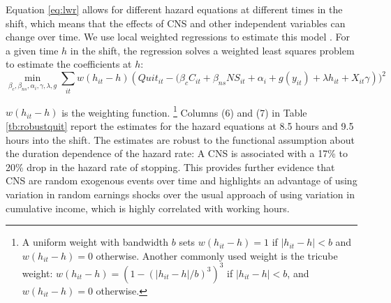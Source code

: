 \documentclass[reviewmode,AEJ]{AEA}
\begin{document}
Equation \eqref{eq:lwr} allows for different hazard equations at different times in the shift, which means that the effects of %
CNS and other independent variables can change over time. We use local weighted regressions to estimate this model \citep{cleveland1988locally}. For a given time $h$ in the shift, the regression solves a weighted least squares problem to estimate the coefficients at $h$:
\[\min_{\beta_c, \beta_{ns}, \alpha_i, \gamma, \lambda, g} \sum_{it} w(h_{it}-h) \left(Quit_{it} - (\beta_cC_{it} + \beta_{ns}{NS}_{it} + \alpha_i + g(y_{it}) + \lambda h_{it} + X_{it}\gamma\right))^2\]

$w(h_{it}-h)$ is the weighting function.%
\footnote{A uniform weight with bandwidth $b$ sets $w(h_{it}-h) = 1$ if $|h_{it}-h|<b$ and $w(h_{it}-h) = 0$ otherwise. Another commonly used weight is the tricube weight: $w(h_{it}-h) = \left(1-(|h_{it}-h|/b)^3\right)^3$ if $|h_{it}-h|<b$, and $w(h_{it}-h) = 0$ otherwise.} 
Columns (6) and (7) in Table \ref{tb:robustquit} report the estimates for the hazard equations at 8.5 hours and 9.5 hours into the shift. The estimates are robust to the functional assumption about the duration dependence of the hazard rate: A CNS is associated with a 17\% to 20\% drop in the hazard rate of stopping. 
This provides further evidence that CNS are random exogenous events over time
and highlights an advantage of using variation in random earnings shocks over 
the usual approach of using variation in cumulative income, which is highly correlated
with working hours.


\end{document}
